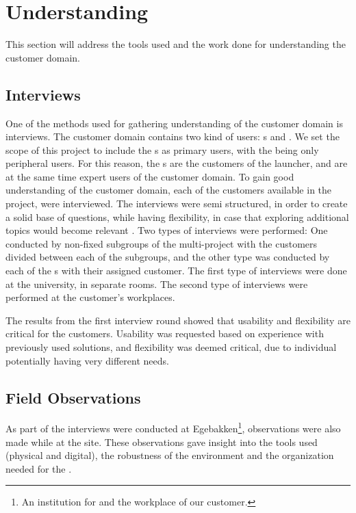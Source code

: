 \section{Understanding}
This section will address the tools used and the work done for understanding the customer domain.

\subsection{Interviews}
One of the methods used for gathering understanding of the customer domain is interviews. 
The customer domain contains two kind of users: \guardian[c]s and \autists[]. 
We set the scope of this project to include the \guardian[]s as primary users, with the \autists[] being only peripheral users. 
For this reason, the \guardian[]s are the customers of the \giraf[] launcher, and are at the same time expert users of the customer domain. 
To gain good understanding of the customer domain, each of the customers available in the project, were interviewed. 
The interviews were semi structured, in order to create a solid base of questions, while having flexibility, in case that exploring additional topics would become relevant . 
Two types of interviews were performed: One conducted by non-fixed subgroups of the multi-project with the customers divided between each of the subgroups, and the other type was conducted by each of the \localgroup{}s with their assigned customer. 
The first type of interviews were done at the university, in separate rooms. 
The second type of interviews were performed at the customer's workplaces. \newline

The results from the first interview round showed that usability and flexibility are critical for the customers. 
Usability was requested based on experience with previously used solutions, and flexibility was deemed critical, due to individual \autists[] potentially having very different needs.

\subsection{Field Observations}
As part of the interviews were conducted at Egebakken\footnote{An institution for \autists[] and the workplace of our customer.}, observations were also made while at the site. 
These observations gave insight into the tools used (physical and digital), the robustness of the environment and the organization needed for the \autists[]. 

